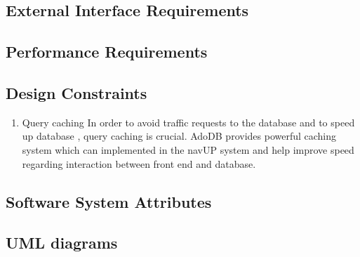 \subsection{External Interface Requirements}
\subsection{Performance Requirements}
\subsection{Design Constraints}
\begin{enumerate}
	\item Query caching
	\newline
	In order to avoid traffic requests to the database and to speed up database , query caching is crucial. AdoDB provides powerful caching system which can implemented in the navUP system and help improve speed regarding interaction between front end and database.
\end{enumerate}
\subsection{Software System Attributes}
\subsection{UML diagrams}
